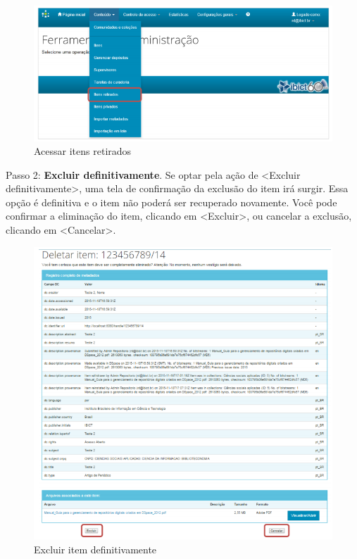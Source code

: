\documentclass[12pt,hidelinks]{article}
\begin{document}
    \begin{figure}[!htp]
                \centering
                \includegraphics[scale=0.8]{figura/Figura102.png}
                \caption{Acessar itens retirados}
            \label{Rotulo}
        \end{figure}
    
    Passo 2: \textbf{Excluir definitivamente}. Se optar pela ação de <Excluir definitivamente>, uma tela de confirmação da exclusão do item irá surgir. Essa opção é definitiva e o item não poderá ser recuperado novamente. Você pode confirmar a eliminação do item, clicando em <Excluir>, ou cancelar a exclusão, clicando em <Cancelar>.
    
    \begin{figure}[!htp]
                \centering
                \includegraphics[scale=0.7]{figura/Figura103.png}
                \caption{Excluir item definitivamente}
            \label{Rotulo}
        \end{figure}
\end{document}
